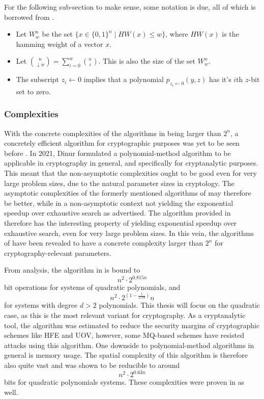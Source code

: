 For the following sub-section to make sense, some notation is due, all of which is borrowed from \cite{cryptoeprint:2021/578}.
\begin{itemize}
    \item Let $W^n_w$ be the set $\{x \in \{0, 1\}^n \mid HW(x) \leq w \}$, where $HW(x)$ is the hamming weight of a vector $x$. 
    \item Let $\binom{n}{\downarrow w} = \sum^w_{i = 0} \binom{n}{i}$. This is also the size of the set $W^n_w$.
    \item The subscript $z_i \leftarrow 0$ implies that a polynomial $p_{z_i \leftarrow 0}(y,z)$ has it's $i$th $z$-bit set to zero.
\end{itemize}

\subsubsection{Complexities}

With the concrete complexities of the algorithms in \cite{doi:10.1137/1.9781611974782.143, Williams2014ThePM} being larger than $2^n$, a concretely efficient algorithm for cryptographic purposes was yet to be seen before \cite{cryptoeprint:2021/578}. In 2021, Dinur formulated a polynomial-method algorithm to be applicable in cryptography in general, and specifically for cryptanalytic purposes. This meant that the non-asymptotic complexities ought to be good even for very large problem sizes, due to the natural parameter sizes in cryptology. The asymptotic complexities of the formerly mentioned algorithms of \cite{doi:10.1137/1.9781611974782.143, Williams2014ThePM} may therefore be better, while in a non-asymptotic context not yielding the exponential speedup over exhaustive search as advertised. The algorithm provided in \cite{cryptoeprint:2021/578} therefore has the interesting property of yielding exponential speedup over exhaustive search, even for very large problem sizes. In this vein, the algorithms of \cite{doi:10.1137/1.9781611974782.143, Williams2014ThePM} have been revealed to have a concrete complexity larger than $2^n$ for cryptography-relevant parameters.

From analysis, the algorithm in \cite{cryptoeprint:2021/578} is bound to 
$$
    n^2 \cdot 2^{0.815n}
$$ 
bit operations for systems of quadratic polynomials, and 
$$
    n^2 \cdot 2^{(1 - \frac{1}{2.7d})}n
$$ 
for systems with degree $d > 2$ polynomials. This thesis will focus on the quadratic case, as this is the most relevant variant for cryptography. As a cryptanalytic tool, the algorithm was estimated to reduce the security margins of cryptographic schemes like HFE and UOV, however, some MQ-based schemes have resisted attacks using this algorithm. One downside to polynomial-method algorithms in general is memory usage. The spatial complexity of this algorithm is therefore also quite vast and was shown to be reducible to around 
$$
    n^2 \cdot 2^{0.63n}
$$ 
bits for quadratic polynomials systems. These complexities were proven in \cite{cryptoeprint:2021/578} as well.

